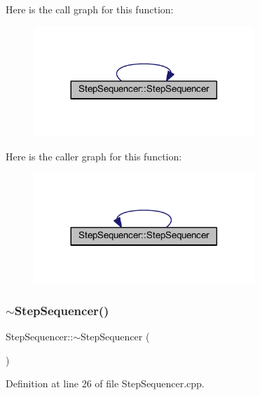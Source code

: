 Here is the call graph for this function\+:
\nopagebreak
\begin{figure}[H]
\begin{center}
\leavevmode
\includegraphics[width=236pt]{class_step_sequencer_a552647854b6f7c5d653432774c357f3e_cgraph}
\end{center}
\end{figure}
Here is the caller graph for this function\+:
\nopagebreak
\begin{figure}[H]
\begin{center}
\leavevmode
\includegraphics[width=236pt]{class_step_sequencer_a552647854b6f7c5d653432774c357f3e_icgraph}
\end{center}
\end{figure}
\mbox{\label{class_step_sequencer_a82bc995a1e19baecda84708de8fa265f}} 
\subsubsection{\texorpdfstring{$\sim$\+Step\+Sequencer()}{~StepSequencer()}}
{\footnotesize\ttfamily Step\+Sequencer\+::$\sim$\+Step\+Sequencer (\begin{DoxyParamCaption}{ }\end{DoxyParamCaption})}



Definition at line 26 of file Step\+Sequencer.\+cpp.



